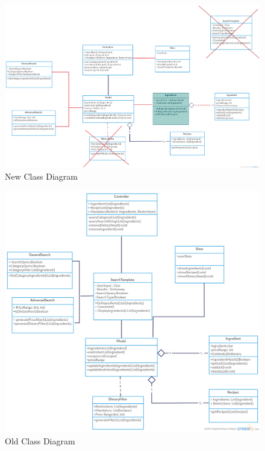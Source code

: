 \documentclass[12pt]{article}
\begin{document}
\begin{enumerate}
  \newpage
  \begin{figure}
      \includegraphics[width=\linewidth]{newclass.png}
      \caption{New Class Diagram}
      \label{fig: newclass}
  \end{figure}


  \begin{figure}
    \includegraphics[width=\linewidth]{oldclass.png}
    \caption{Old Class Diagram}
    \label{fig: oldclass}
  \end{figure}


\end{enumerate}
\end{document}
